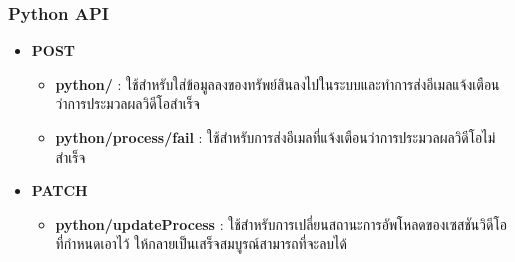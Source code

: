 \subsubsection{Python API}

\ifenglish
\else
\begin{itemize}
    \item \textbf{POST}
    \begin{itemize}
        \item \textbf{python/} : ใช้สำหรับใส่ข้อมูลลงของทรัพย์สินลงไปในระบบและทำการส่งอีเมลแจ้งเตือนว่าการประมวลผลวิดีโอสำเร็จ
        \item \textbf{python/process/fail} : ใช้สำหรับการส่งอีเมลที่แจ้งเตือนว่าการประมวลผลวิดีโอไม่สำเร็จ
    \end{itemize}
    \item \textbf{PATCH}
    \begin{itemize}
        \item \textbf{python/updateProcess} : ใช้สำหรับการเปลี่ยนสถานะการอัพโหลดของเซสชันวิดีโอที่กำหนดเอาไว้ ให้กลายเป็นเสร็จสมบูรณ์สามารถที่จะลบได้
    \end{itemize}
\end{itemize}
\fi